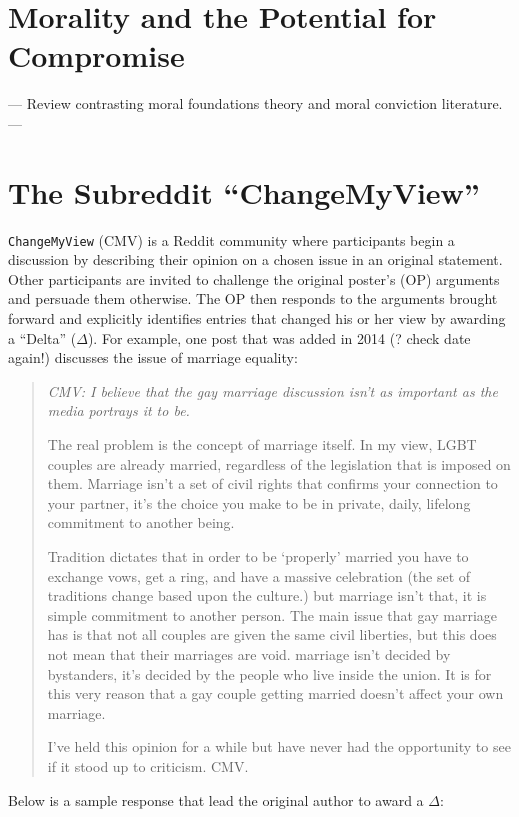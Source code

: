 \section{Morality and the Potential for Compromise}

--- Review contrasting moral foundations theory and moral conviction literature. ---


\section{The Subreddit ``ChangeMyView''}

\texttt{ChangeMyView} (CMV) is a Reddit community where participants begin a discussion by describing their opinion on a chosen issue in an original statement. Other participants are invited to challenge the original poster's (OP) arguments and persuade them otherwise. The OP then responds to the arguments brought forward and explicitly identifies entries that changed his or her view by awarding a ``Delta'' (\(\Delta\)). For example, one post that was added in 2014 (? check date again!) discusses the issue of marriage equality: 
\begin{quote}\singlespacing
\emph{CMV: I believe that the gay marriage discussion isn't as important as the media portrays it to be.}

The real problem is the concept of marriage itself. In my view, LGBT couples are already married, regardless of the legislation that is imposed on them. Marriage isn't a set of civil rights that confirms your connection to your partner, it's the choice you make to be in private, daily, lifelong commitment to another being.

Tradition dictates that in order to be `properly' married you have to exchange vows, get a ring, and have a massive celebration (the set of traditions change based upon the culture.) but marriage isn't that, it is simple commitment to another person. The main issue that gay marriage has is that not all couples are given the same civil liberties, but this does not mean that their marriages are void. marriage isn't decided by bystanders, it's decided by the people who live inside the union. It is for this very reason that a gay couple getting married doesn't affect your own marriage.

I've held this opinion for a while but have never had the opportunity to see if it stood up to criticism. CMV.
\end{quote}
Below is a sample response that lead the original author to award a \(\Delta\):
